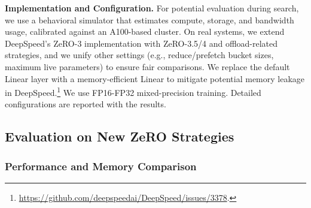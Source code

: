 \documentclass[letterpaper,twocolumn,10pt]{article}
\begin{document}

\textbf{Implementation and Configuration.} For potential evaluation during search, we use a behavioral simulator that estimates compute, storage, and bandwidth usage, calibrated against an A100-based cluster. On real systems, we extend DeepSpeed's ZeRO-3 implementation with ZeRO-3.5/4 and offload-related strategies, and we unify other settings (e.g., reduce/prefetch bucket sizes, maximum live parameters) to ensure fair comparisons. We replace the default Linear layer with a memory-efficient Linear to mitigate potential memory leakage in DeepSpeed.\footnote{\url{https://github.com/deepspeedai/DeepSpeed/issues/3378}.} We use FP16-FP32 mixed-precision training. Detailed configurations are reported with the results. 




\subsection{Evaluation on New ZeRO Strategies}
\label{sec:exp_zeros}

\subsubsection{Performance and Memory Comparison}
\label{sec:zero_performance}
\end{document}

